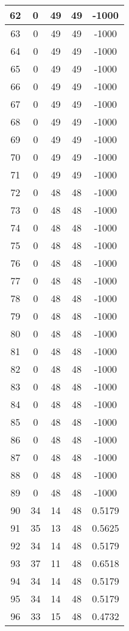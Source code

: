 \documentclass[letterpaper, 12pt]{article}
\begin{document}
\begin{longtable}{|c|c|c|c|c|}
\hline
62 & 0 & 49 & 49 & -1000 \\
\hline
63 & 0 & 49 & 49 & -1000 \\
\hline
64 & 0 & 49 & 49 & -1000 \\
\hline
65 & 0 & 49 & 49 & -1000 \\
\hline
66 & 0 & 49 & 49 & -1000 \\
\hline
67 & 0 & 49 & 49 & -1000 \\
\hline
68 & 0 & 49 & 49 & -1000 \\
\hline
69 & 0 & 49 & 49 & -1000 \\
\hline
70 & 0 & 49 & 49 & -1000 \\
\hline
71 & 0 & 49 & 49 & -1000 \\
\hline
72 & 0 & 48 & 48 & -1000 \\
\hline
73 & 0 & 48 & 48 & -1000 \\
\hline
74 & 0 & 48 & 48 & -1000 \\
\hline
75 & 0 & 48 & 48 & -1000 \\
\hline
76 & 0 & 48 & 48 & -1000 \\
\hline
77 & 0 & 48 & 48 & -1000 \\
\hline
78 & 0 & 48 & 48 & -1000 \\
\hline
79 & 0 & 48 & 48 & -1000 \\
\hline
80 & 0 & 48 & 48 & -1000 \\
\hline
81 & 0 & 48 & 48 & -1000 \\
\hline
82 & 0 & 48 & 48 & -1000 \\
\hline
83 & 0 & 48 & 48 & -1000 \\
\hline
84 & 0 & 48 & 48 & -1000 \\
\hline
85 & 0 & 48 & 48 & -1000 \\
\hline
86 & 0 & 48 & 48 & -1000 \\
\hline
87 & 0 & 48 & 48 & -1000 \\
\hline
88 & 0 & 48 & 48 & -1000 \\
\hline
89 & 0 & 48 & 48 & -1000 \\
\hline
90 & 34 & 14 & 48 & 0.5179 \\
\hline
91 & 35 & 13 & 48 & 0.5625 \\
\hline
92 & 34 & 14 & 48 & 0.5179 \\
\hline
93 & 37 & 11 & 48 & 0.6518 \\
\hline
94 & 34 & 14 & 48 & 0.5179 \\
\hline
95 & 34 & 14 & 48 & 0.5179 \\
\hline
96 & 33 & 15 & 48 & 0.4732 \\

\end{longtable}
\end{document}
